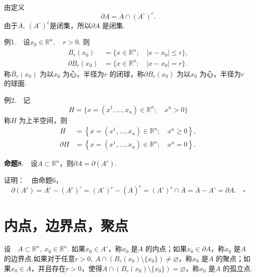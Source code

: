 \documentclass{article}
\begin{document}
\vspace{20pt}

\noindent 由定义
\begin{equation*}
    \partial A = \overline{A}\cap (A^{\circ })^{c}.
\end{equation*}
由于\(\overline{A},\ (A^{\circ })^{c}\)是闭集，所以\(\partial A\) 是闭集.

\vspace{20pt}

\noindent 例1.\ \ 设\(x_0 \in \mathbb{R}^n,\quad r > 0\). 则
\begin{align*}
    \overline{B_{r}}(x_0) &= \{x \in \mathbb{R}^n;\quad | x - x_0 | \le r \}, \\
    \partial B_r(x_0) &= \{x \in \mathbb{R}^n;\quad | x - x_0 |= r \}.
\end{align*}
称\(\overline{B_{r}}(x_0)\) 为以\(x_0\) 为心，半径为\(r\) 的闭球，称\(\partial B_r(x_0)\) 为以\(x_0\) 为心，半径为\(r\) 的球面.

\vspace{20pt}

\noindent 例2.\ \ 记
\begin{equation*}
    H = \{x =(x^1,\dots ,x_n)\in \mathbb{R}^n;\quad x^n > 0\}
\end{equation*}
称\(H\) 为上半空间，则
\begin{align*}
    \overline{H} &= \left\{x =(x^1,\dots ,x_n)\in \mathbb{R}^n;\quad x^n \ge  0\right\}, \\
    \partial H &= \left\{x =(x^1,\dots ,x_n)\in \mathbb{R}^n;\quad x^n = 0\right\}.
\end{align*}

\newpage

\noindent \textbf{命题8}.\ \ 设\(A \subset \mathbb{R}^n\)，则\(\partial A =\partial(A^{c})\).

\vspace{20pt}

\noindent 证明：\ \ 由命题6，
\begin{equation*}
    \partial(A^c) = \overline{A^c} -(A^c)^{\circ } = \left( A^{\circ } \right)^{c} -\left(\overline{A}\right)^{c} =(A^{\circ })^{c}\cap \overline{A} = \overline{A} - A^{\circ } =\partial A.\quad \square
\end{equation*}

\newpage

\section{内点，边界点，聚点}
\noindent 设\ \ \(A \subset \mathbb{R}^n,\ x_0 \in \mathbb{R}^n\). 如果\(x_0 \in A^{\circ }\)，称\(x_0\) 是\(A\) 的内点；如果\(x_0 \in \partial A\)，称\(x_0\) 是\(A\) 的边界点.如果对于任意\(r > 0,\  A \cap \left( B_r(x_0)\setminus \{x_0\}  \right) \neq \varnothing  \)，称\(x_0\) 是\(A\) 的聚点；如果\(x_0 \in A\)，并且存在\(r > 0\)，使得\(A \cap \left( B_r(x_0)\setminus \{x_0\}  \right) = \varnothing \)，称\(x_0\) 是\(A\) 的孤立点.
\end{document}
